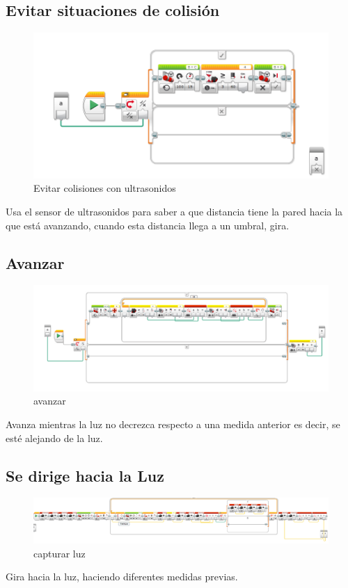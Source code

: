 \documentclass[12pt,a4paper]{article}
\begin{document}
\subsection{Evitar situaciones de colisión}
\begin{figure}[H]
	\caption{Evitar colisiones con ultrasonidos}
	\includegraphics[scale=0.45]{RobotEsquivar.PNG}
	\centering
\end{figure}
Usa el sensor de ultrasonidos para saber a que distancia tiene la pared hacia la que está avanzando, cuando esta distancia llega a un umbral, gira.
\subsection{Avanzar}
\begin{figure}[H]
	\caption{avanzar}
	\includegraphics[scale=0.45]{RobotAvanzar.PNG}
	\centering
\end{figure}
Avanza mientras la luz no decrezca respecto a una medida anterior es decir, se esté alejando de la luz.
\subsection{Se dirige hacia la Luz}
\begin{figure}[H]
	\caption{capturar luz}
	\includegraphics[scale=0.45]{RobotLuzMayorGood.PNG}
	\centering
\end{figure}
Gira hacia la luz, haciendo diferentes medidas previas.
\end{document}
